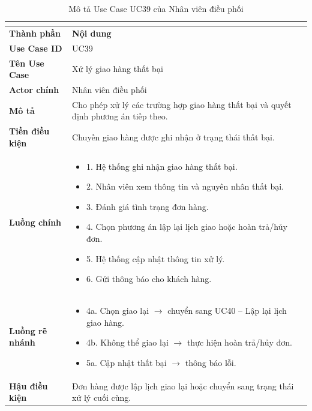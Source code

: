 \begin{longtable}{|C{3cm}|L{11cm}|}
\caption{Mô tả Use Case UC39 của Nhân viên điều phối}\\
\label{tab:mo-ta-uc39-dieu-phoi}\\
\hline
\textbf{Thành phần} & \textbf{Nội dung} \\
\hline
\textbf{Use Case ID} & UC39 \\
\hline
\textbf{Tên Use Case} & Xử lý giao hàng thất bại \\
\hline
\textbf{Actor chính} & Nhân viên điều phối \\
\hline
\textbf{Mô tả} &
Cho phép xử lý các trường hợp giao hàng thất bại và quyết định phương án tiếp theo. \\
\hline
\textbf{Tiền điều kiện} &
Chuyến giao hàng được ghi nhận ở trạng thái thất bại. \\
\hline
\textbf{Luồng chính} &
\begin{itemize}[leftmargin=*,topsep=2pt,itemsep=2pt]
    \item 1. Hệ thống ghi nhận giao hàng thất bại.
    \item 2. Nhân viên xem thông tin và nguyên nhân thất bại.
    \item 3. Đánh giá tình trạng đơn hàng.
    \item 4. Chọn phương án lập lại lịch giao hoặc hoàn trả/hủy đơn.
    \item 5. Hệ thống cập nhật thông tin xử lý.
    \item 6. Gửi thông báo cho khách hàng.
\end{itemize} \\
\hline
\textbf{Luồng rẽ nhánh} &
\begin{itemize}[leftmargin=*,topsep=2pt,itemsep=2pt]
    \item 4a. Chọn giao lại $\rightarrow$ chuyển sang UC40 -- Lập lại lịch giao hàng.
    \item 4b. Không thể giao lại $\rightarrow$ thực hiện hoàn trả/hủy đơn.
    \item 5a. Cập nhật thất bại $\rightarrow$ thông báo lỗi.
\end{itemize} \\
\hline
\textbf{Hậu điều kiện} &
Đơn hàng được lập lịch giao lại hoặc chuyển sang trạng thái xử lý cuối cùng. \\
\hline
\end{longtable}


